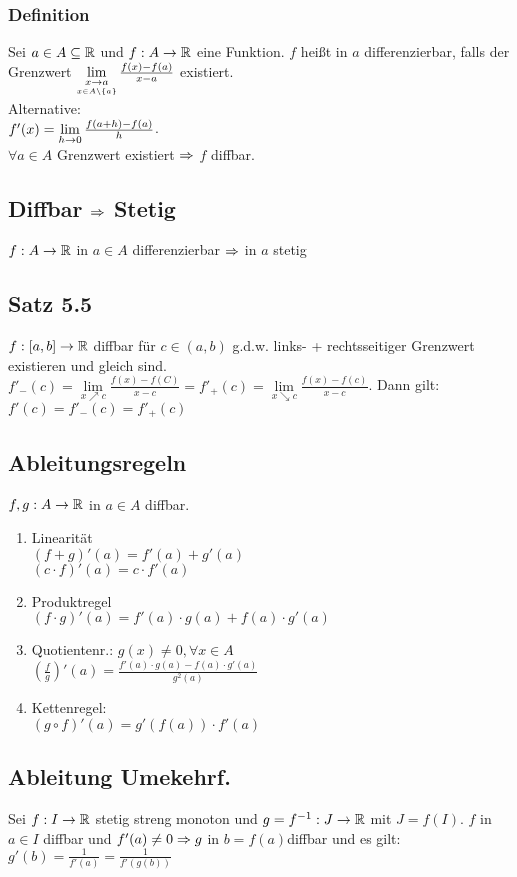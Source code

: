 \subsubsection*{Definition}
Sei $a \in A \subseteq \mathbb R$ und $f: A \rightarrow \mathbb R$ eine Funktion. $f$ heißt in $a$ differenzierbar, falls der Grenzwert $\lim\limits_{\underset{x \in A\backslash\{a\}}{x \rightarrow a}} \frac{f(x) - f(a)}{x - a}$ existiert. \\
Alternative:\\$f'(x) = \lim\limits_{h \rightarrow 0} \frac{f(a + h) - f(a)}{h}$.\\
$\forall a \in A$ Grenzwert existiert $\Rightarrow$ $f$ diffbar.

\subsection*{Diffbar \texorpdfstring{$\Rightarrow$}{folgt} Stetig}
$f:A \rightarrow \mathbb R$ in $a \in A $ differenzierbar $\Rightarrow$ in $a$ stetig
\subsection*{Satz 5.5}
$f:[a, b] \rightarrow \mathbb R$ diffbar für $c\in (a, b)$ g.d.w. links- + rechtsseitiger Grenzwert existieren und gleich sind. $f'_{-}(c) = \lim\limits_{x \nearrow c} \frac{f(x) - f(C)}{x - c} = f'_{+}(c) = \lim\limits_{x \searrow c} \frac{f(x) - f(c)}{x - c}$. Dann gilt: $f'(c) = f'_{-}(c) = f'_{+}(c)$
\subsection*{Ableitungsregeln}
$f, g: A \rightarrow \mathbb R$ in $a \in A$ diffbar.
\begin{enumerate}[label=\alph*., noitemsep]
    \item Linearität\\
    $(f + g)'(a) = f'(a) + g'(a)$\\
    $(c \cdot f)'(a) = c \cdot f'(a)$
    \item Produktregel\\
    $(f \cdot g)'(a) = f'(a) \cdot g(a) + f(a) \cdot g'(a)$
    \item Quotientenr.: $g(x) \neq 0, \forall x \in A$\\
    $\left(\frac{f}{g}\right)'(a) = \frac{f'(a) \cdot g(a) - f(a) \cdot g'(a)}{g^2(a)}$
    \item Kettenregel:\\
    $(g \circ f)'(a) = g'(f(a)) \cdot f'(a)$
\end{enumerate}
\subsection*{Ableitung Umekehrf.}
Sei $f:I\rightarrow \mathbb R$ stetig streng monoton und $g = f^{-1}:J\rightarrow\mathbb R$ mit $J = f(I)$. $f$ in $a \in I$ diffbar und $f'(a)\neq 0 \Rightarrow g$ in $b = f(a)$diffbar und es gilt: $g'(b) = \frac{1}{f'(a)} = \frac{1}{f'(g(b))}$
